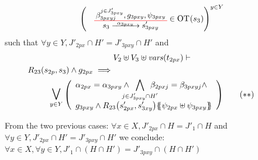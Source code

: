 \documentclass[runningheads]{llncs}
\begin{document}
\begin{enumerate}
\begin{align*}
\mpar{\OTx{3}{pxy}{3pxy}{3pxy} \in \fOT{s_3}}^{y \in Y} 
\end{align*}
such that $\forall y \in Y, J'_{2px} \cap H' = J'_{3pxy} \cap H'$ and
\begin{multline*}
V_2 \uplus V_3 \uplus \fvars{t_{2px}} \vdash\\
R_{23}\mpar{s_{2p}, s_{3}} \wedge g_{2px} \implies \hspace{7cm}\\ \operatorname*{\bigsymb{\bigvee}}_{y \in Y} \mpar{\everymath{\displaystyle}
\begin{array}{l}
			 \alpha_{2px}=\alpha_{3pxy} \wedge \bigwedge_\subbox{j \in J'_{3pxy} \cap H'} \beta_{2pxj}=\beta_{3pxyj} \nwedge \\
			g_{3pxy} \wedge R_{23}\mpar{s'_{2px}, s'_{3xy}}\psubst{\psi_{2px} \uplus \psi_{3pxy}}
		\end{array}}  \qquad (**)
\end{multline*}

From the  two previous cases: 
$\forall x \in X, J'_{2px} \cap H = J'_1 \cap H$ and
$\forall y \in Y, J'_{2px} \cap H' = J'_{3pxy} \cap H'$ we conclude:
$\forall x \in X, \forall y \in Y,  J'_1 \cap (H \cap H') = J'_{3pxy} \cap (H\cap H')$ \\


\end{enumerate}
\end{document}
